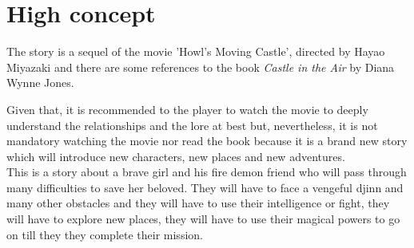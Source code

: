 \section{High concept}

The story is a sequel of the movie 'Howl's Moving Castle', directed by Hayao Miyazaki and there are some references to the book \textit{Castle in the Air} by Diana Wynne Jones.

Given that, it is recommended to the player to watch the movie to deeply understand the relationships and the lore at best but, nevertheless, it is not mandatory watching the movie nor read the book because it is a brand new story which will introduce new characters, new places and new adventures.\\

This is a story about a brave girl and his fire demon friend who will pass through many difficulties to save her beloved. They will have to face a vengeful djinn and many other obstacles and they will have to use their intelligence or fight, they will have to explore new places, they  will have to use their magical powers to go on till they they complete their mission. 


